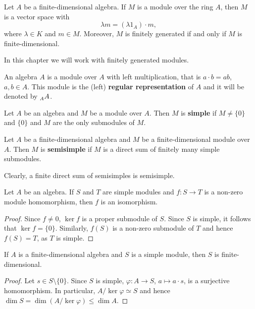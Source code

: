 Let $A$ be a finite-dimensional algebra. 
If $M$ is a module over the ring $A$, then $M$ is a vector space with  
\[
\lambda m=(\lambda 1_A)\cdot m, 
\]
where $\lambda\in K$ and $m\in M$. Moreover, $M$ is finitely generated if and only if $M$ is finite-dimensional.  

In this chapter we will work with finitely generated modules. 

\begin{example}
An algebra  $A$ is a module over $A$ with left multiplication, that is $a\cdot b=ab$, $a,b\in A$.
This module is the (left) \textbf{regular representation} of $A$ and it will be denoted by $\prescript{}{A}{A}$. 
\end{example}

\begin{definition}
	Let $A$ be an algebra and $M$ be a module over $A$. Then 
	$M$ is \textbf{simple} if $M\ne\{0\}$ and $\{0\}$ and $M$ 
	are the only submodules of $M$.	
\end{definition}

\begin{definition}
	Let $A$ be a finite-dimensional 
	algebra and $M$ be a finite-dimensional module over $A$. Then 
	$M$ is \textbf{semisimple} if $M$ is a direct sum of 
	finitely many simple submodules.  
\end{definition}

Clearly, a finite direct sum of semisimples is semisimple. 

\begin{lemma}[Schur]
	Let $A$ be an algebra. If $S$ and $T$ are
	simple modules and $f\colon S\to T$ is a non-zero module homomorphism, 
	then $f$ is an isomorphism. 
\end{lemma}

\begin{proof}
Since $f\ne 0$, $\ker f$ is a proper submodule of $S$. Since $S$ is simple, it follows 
that $\ker f=\{0\}$. Similarly, $f(S)$ 
is a non-zero submodule of $T$ and hence $f(S)=T$, as $T$ is simple. 	
\end{proof}

\begin{proposition}
    If $A$ is a finite-dimensional algebra and $S$ is a simple module, then $S$ is finite-dimensional. 
\end{proposition}

\begin{proof}
    Let $s\in S\setminus\{0\}$. Since $S$ is simple, $\varphi\colon A\to S$, $a\mapsto a\cdot s$, is a surjective homomorphism. 
    In particular, $A/\ker\varphi\simeq S$ and hence $\dim S=\dim (A/\ker\varphi)\leq \dim A$. 
\end{proof}

